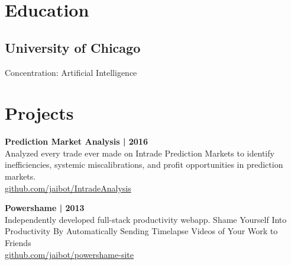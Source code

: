 \documentclass[]{resume}
\begin{document}
%
%
\lastupdated
\github

%
%

%
%

\begin{minipage}[t]{0.33\textwidth}


\section{Education}

\subsection{University of Chicago}
Concentration: Artificial Intelligence
\sectionsep


\section{Projects}

\textbf{Prediction Market Analysis | 2016}\\
Analyzed every trade ever made on Intrade Prediction Markets to identify
inefficiencies, systemic miscalibrations, and profit opportunities in prediction markets.\\
\href{http://github.com/jaibot/IntradeAnalysis}{github.com/jaibot/IntradeAnalysis }
\sectionsep

\textbf{Powershame | 2013} \\
Independently developed full-stack productivity webapp.
Shame Yourself Into Productivity By Automatically Sending Timelapse Videos of Your Work to Friends\\
\href{http://github.com/jaibot/powershame-site}{github.com/jaibot/powershame-site}
\sectionsep


\end{minipage}
\end{document}
